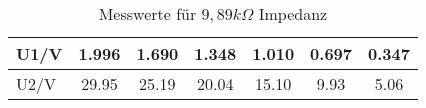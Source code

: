 \begin{table}[H]
	\centering
  \caption{ Messwerte für $9,89 k\Omega$ Impedanz}

\begin{tabular}{|l|c|c|c|c|c|c|}
\hline
   U1/V & 1.996 & 1.690 & 1.348 & 1.010 & 0.697 & 0.347 \\
\hline   
   U2/V & 29.95 & 25.19 & 20.04 & 15.10 & 9.93 & 5.06 \\
\hline
\end{tabular}

\end{table}


